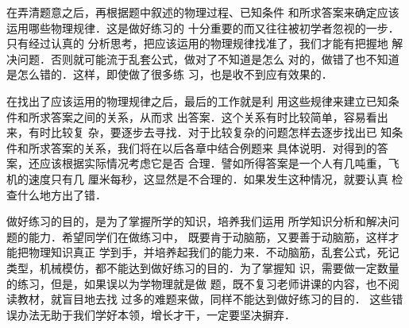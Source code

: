     在弄清题意之后，再根据题中叙述的物理过程、已知条件
和所求答案来确定应该运用哪些物理规律．这是做好练习的
十分重要的而又往往被初学者忽视的一步．只有经过认真的
分析思考，把应该运用的物理规律找准了，我们才能有把握地
解决问题．否则就可能流于乱套公式，做对了不知道是怎么
对的，做错了也不知道是怎么错的．这样，即使做了很多练
习，也是收不到应有效果的．

    在找出了应该运用的物理规律之后，最后的工作就是利
用这些规律来建立已知条件和所求答案之间的关系，从而求
出答案．这个关系有时比较简单，容易看出来，有时比较复
杂，要逐步去寻找．对于比较复杂的问题怎样去逐步找出已
知条件和所求答案的关系，我们将在以后各章中结合例题来
具体说明．对得到的答案，还应该根据实际情况考虑它是否
合理．譬如所得答案是一个人有几吨重，飞机的速度只有几
厘米每秒，这显然是不合理的．如果发生这种情况，就要认真
检查什么地方出了错．

    做好练习的目的，是为了掌握所学的知识，培养我们运用
所学知识分析和解决问题的能力．希望同学们在做练习中，
既要肯于动脑筋，又要善于动脑筋，这样才能把物理知识真正
学到手，并培养起我们的能力来．不动脑筋，乱套公式，死记
类型，机械模仿，都不能达到做好练习的目的．为了掌握知
识，需要做一定数量的练习，但是，如果误以为学物理就是做
题，既不复习老师讲课的内容，也不阅读教材，就盲目地去找
过多的难题来做，同样不能达到做好练习的目的．
这些错误办法无助于我们学好本领，增长才干，一定要坚决摒弃．



